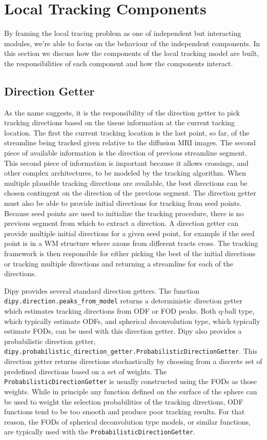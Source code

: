 \section{Local Tracking Components}
    By framing the local tracing problem as one of independent but interacting modules, we're able to focus on the behaviour of the independent components. In this section we discuss how the components of the local tracking model are built, the responsibilities of each component and how the components interact.

\subsection{Direction Getter}
    As the name suggests, it is the responsibility of the direction getter to pick tracking directions based on the tissue information at the current tacking location. The first the current tracking location is the last point, so far, of the streamline being tracked given relative to the diffusion MRI images. The second piece of available information is the direction of previous streamline segment. This second piece of information is important because it allows crossings, and other complex architectures, to be modeled by the tracking algorithm. When multiple plausible tracking directions are available, the best directions can be chosen contingent on the direction of the previous segment. The direction getter must also be able to provide initial directions for tracking from seed points. Because seed points are used to initialize the tracking procedure, there is no previous segment from which to extract a direction. A direction getter can provide multiple initial directions for a given seed point, for example if the seed point is in a WM structure where axons from different tracts cross. The tracking framework is then responsible for either picking the best of the initial directions or tracking multiple directions and returning a streamline for each of the directions.
    
    Dipy provides several standard direction getters. The function \verb|dipy.direction.peaks_from_model| returns a deterministic direction getter which estimates tracking directions from ODF or FOD peaks. Both q-ball type, which typically estimate ODFs, and spherical deconvolution type, which typically estimate FODs, can be used with this direction getter. Dipy also provides a probabilistic direction getter, \verb|dipy.probabilistic_direction_getter.ProbabilisticDirectionGetter|. This direction getter returns directions stochastically by choosing from a discrete set of predefined directions based on a set of weights. The \verb|ProbabilisticDirectionGetter| is usually constructed using the FODs as those weights. While in principle any function defined on the surface of the sphere can be used to weight the selection probabilities of the tracking directions, ODF functions tend to be too smooth and produce poor tracking results. For that reason, the FODs of spherical deconvolution type models, or similar functions, are typically used with the \verb|ProbabilisticDirectionGetter|.

